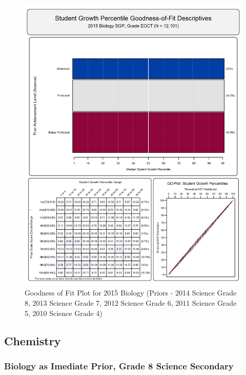 \documentclass[12pt]{article}
\begin{document}
\begin{figure}[htbp]
\centering
\includegraphics{../img/Goodness_of_Fit/BIOLOGY.2015/2015_BIOLOGY_EOCT;2014_SCIENCE_8;2013_SCIENCE_7;2012_SCIENCE_6;2011_SCIENCE_5;2010_SCIENCE_4.png}
\caption{Goodness of Fit Plot for 2015 Biology (Priors - 2014 Science
Grade 8, 2013 Science Grade 7, 2012 Science Grade 6, 2011 Science Grade
5, 2010 Science Grade 4)}
\end{figure}

\clearpage 

\subsection{Chemistry}\label{chemistry}

\subsubsection{Biology as Imediate Prior, Grade 8 Science
Secondary}\label{biology-as-imediate-prior-grade-8-science-secondary}
\end{document}

